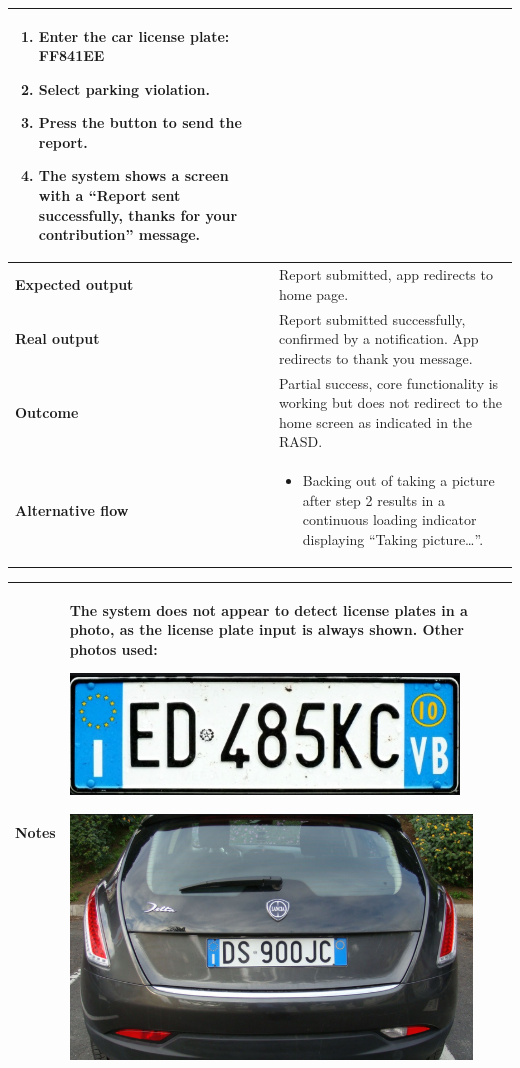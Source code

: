 \begin{table}[H]
\begin{tabular}{p{3cm}p{10cm}}
\begin{enumerate}
            \item Enter the car license plate: FF841EE
            \item Select parking violation.
            \item Press the button to send the report.
            \item The system shows a screen with a “Report sent successfully, thanks for your contribution” message.
        \end{enumerate} \\ \hline
    \textbf{Expected output} & Report submitted, app redirects to home page. \\ \hline
    \textbf{Real output} & Report submitted successfully, confirmed by a notification. App redirects to thank you message. \\ \hline
    \textbf{Outcome} & Partial success, core functionality is working but does not redirect to the home screen as indicated in the RASD. \\ \hline
    \textbf{Alternative flow} & 
        \begin{itemize} \itemsep0em
            \item Backing out of taking a picture after step 2 results in a continuous loading indicator displaying “Taking picture…”.
        \end{itemize} \\ \hline
    
    \end{tabular}
\end{table}

\begin{table}[H]
    \centering
    \begin{tabular}{p{3cm}p{10cm}}
        \textbf{Notes} & The system does not appear to detect license plates in a photo, as the license plate input is always shown.
        Other photos used:
        \begin{center}
            \includegraphics[width=.3\textwidth]{Images/test-photo2.png}
        \end{center}
        \begin{center}
            \includegraphics[width=.3\textwidth]{Images/test-photo3.png}
        \end{center}
     \\ \hline
    \end{tabular}
\end{table}

